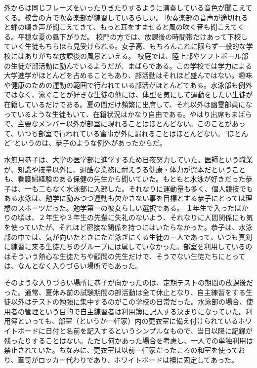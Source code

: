 外からは同じフレーズをいったりきたりするように演奏している音色が聞こえてくる。校舎の方で吹奏楽部が練習しているらしい。
吹奏楽部の音声が途切れると蝉の鳴き声が聞こえてきて、もっと耳をすませると風の吹く音も聞こえてくる。平穏な夏の昼下がりだ。
校門の方では、放課後の時間帯だけあって下校していく生徒もちらほら見受けられる。女子高、もちろんこれに限らず一般的な学校にはありがちな放課後の風景といえる。
校庭では、陸上部やソフトボール部の生徒が部活動に励んでいるようだが、まばらである。この学校では学力による大学進学がほとんどを占めることもあり、部活動はそれほど盛んではない。趣味や健康のための運動の範囲で行われている部活がほとんどである。水泳部も例外ではなく、泳ぐことが好きな生徒の他には、体型を気にして運動をしたい生徒が在籍しているだけである。夏の間だけ頻繁に出席して、それ以外は幽霊部員になっているような生徒もいて、在籍状況はかなり自由である。やはり出席もまばらで、主要なメンバー以外が部室に現れることはほとんどない。このことがあって、いつも部室で行われている蜜事が外に漏れることはほとんどない。“ほとんど”というのは、恭子のような例外があったからだ。

水無月恭子は、大学の医学部に進学するため日夜努力していた。医師という職業が、知識や技量以外に、過酷な業務に耐えうる健康・体力が資本だということも、看護婦経験のある保健の先生から聞いていた。もともと水泳が好きだった恭子は、一も二もなく水泳部に入部した。それなりに運動量も多く、個人競技でもある水泳は、勉学に励みつつ運動も欠かさない事を目標とする恭子にとっては理想のスポーツだった。勉学第一の彼女らしい選択である。
１年生で入ったばかりの頃は、２年生や３年生の先輩に失礼のないよう、それなりに人間関係にも気を使っていたが、それほど密接な関係を持つにはいたらなかった。恭子は、水泳部の中では、気が向いたときにただ泳ぎにくる生徒の一人であって、いつも真剣に練習に来る生徒たちのグループには属していなかった。部室を利用しているのはそういう熱心な生徒たちや顧問の先生だけで、そうでない生徒たちにとっては、なんとなく入りづらい場所でもあった。

そのような入りづらい場所に恭子が向かったのは、定期テストの期間の放課後だった。通常、夏休み前の試験期間の部活動は全て休止となり、自主練習をする生徒以外はテストの勉強に集中するのがこの学校の日常だった。水泳部の場合、使用者の管理という目的で自主練習者は利用簿に記入する決まりになっていた。利用簿といっても、部室（というか一軒家）内の更衣室に備え付けられているホワイトボードに日付と名前を記入するというシンプルなもので、当日以降に記録が残ったりすることはない。ただし何かあった場合を考慮し、一人での単独利用は禁止されていた。ちなみに、更衣室は以前一軒家だったころの和室を使っており、箪笥がロッカー代わりであり、ホワイトボードは襖に固定してあった。

